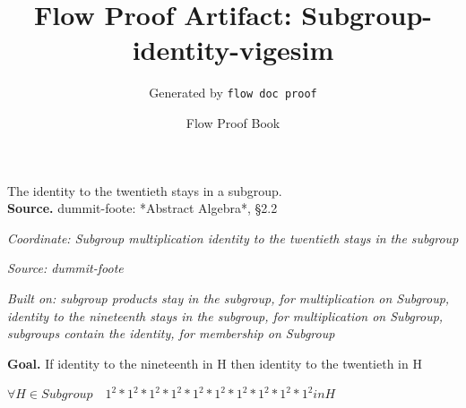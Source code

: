\documentclass[11pt]{article}
\title{Flow Proof Artifact: Subgroup-identity-vigesim}
\author{Generated by \texttt{flow doc proof}}
\date{Flow Proof Book}
\theoremstyle{definition}
\begin{document}
\maketitle
The identity to the twentieth stays in a subgroup.\\[0.5em]
\textbf{Source.} dummit-foote: *Abstract Algebra*, §2.2\\[0.5em]
\bigskip
{}\par
\smallskip\noindent\textit{Coordinate: Subgroup \cdot multiplication \cdot identity to the twentieth stays in the subgroup}\par
\smallskip\noindent\textit{Source: dummit-foote}\par
\smallskip\noindent\textit{Built on: subgroup products stay in the subgroup, for multiplication on Subgroup, identity to the nineteenth stays in the subgroup, for multiplication on Subgroup, subgroups contain the identity, for membership on Subgroup}\par
\medskip
\noindent\textbf{Goal.} If identity to the nineteenth in H then identity to the twentieth in H\par
\noindent$\displaystyle \forall H \in Subgroup\quad 1^{2} * 1^{2} * 1^{2} * 1^{2} * 1^{2} * 1^{2} * 1^{2} * 1^{2} * 1^{2} * 1^{2} in H$\par
\medskip
\noindent
\end{document}
